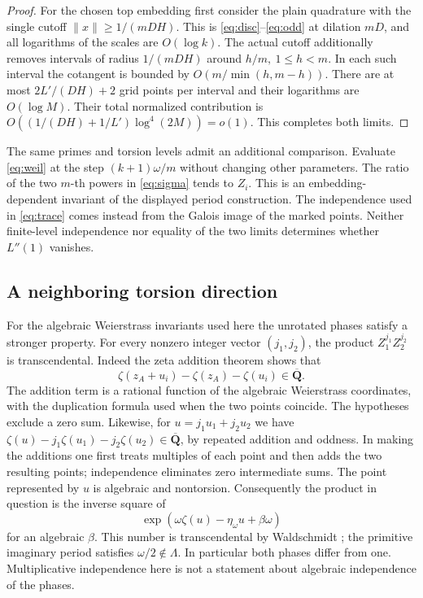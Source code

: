 \documentclass[11pt]{article}
\newcommand{\Q}{\mathbf Q}\newcommand{\R}{\mathbf R}\newcommand{\Z}{\mathbf Z}
\begin{document}
\begin{proof}
For the chosen top embedding first consider the plain quadrature with
the single cutoff \(\|x\|\ge1/(mDH)\). This is \eqref{eq:disc}--\eqref{eq:odd} at dilation
\(mD\), and all logarithms of the scales are \(O(\log k)\). The actual
cutoff additionally removes intervals of radius \(1/(mDH)\) around
\(h/m,\ 1\le h<m\). In each such interval the cotangent is bounded
by \(O(m/\min(h,m-h))\). There are at most \(2L'/(DH)+2\)
grid points per interval and their logarithms are \(O(\log M)\).
Their total normalized contribution is
\(O((1/(DH)+1/L')\log^4(2M))=o(1)\).
This completes both limits.
\end{proof}

The same primes and torsion levels admit an additional comparison. Evaluate
\eqref{eq:weil} at the step \((k+1)\omega/m\) without changing other parameters.
The ratio of the two \(m\)-th powers in \eqref{eq:sigma} tends to \(Z_i\).
This is an embedding-dependent invariant of the displayed period
construction. The independence used in \eqref{eq:trace} comes instead from the Galois
image of the marked points. Neither finite-level independence nor equality
of the two limits determines whether \(L''(1)\) vanishes.

\subsection{A neighboring torsion direction}
For the algebraic Weierstrass invariants used here the unrotated phases
satisfy a stronger property. For every nonzero integer vector $(j_1,j_2)$,
the product $Z_1^{j_1}Z_2^{j_2}$ is transcendental. Indeed the zeta
addition theorem shows that
\[
 \zeta(z_A+u_i)-\zeta(z_A)-\zeta(u_i)\in\overline{\Q}.
\]
The addition term is a rational function of the algebraic Weierstrass
coordinates, with the duplication formula used when the two points
coincide. The hypotheses exclude a zero sum. Likewise, for
$u=j_1u_1+j_2u_2$ we have
$\zeta(u)-j_1\zeta(u_1)-j_2\zeta(u_2)\in\overline{\Q}$, by repeated
addition and oddness. In making the additions one first treats
multiples of each point and then adds the two resulting points;
independence eliminates zero intermediate sums. The point represented
by $u$ is algebraic and nontorsion. Consequently the product in
question is the inverse square of
\[
 \exp(\omega\zeta(u)-\eta_\omega u+\beta\omega)
\]
for an algebraic $\beta$. This number is transcendental by
Waldschmidt \cite[Thm.~7.2.1]{Wal}; the primitive imaginary period
satisfies $\omega/2\notin\Lambda$. In particular both phases differ
from one. Multiplicative independence here is not a statement about
algebraic independence of the phases.
\end{document}
